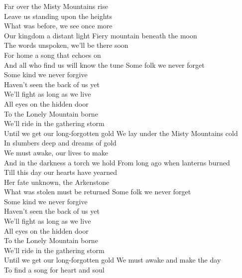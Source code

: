 \begin{flushleft}
Far over the Misty Mountains rise\\
Leave us standing upon the heights\\
What was before, we see once more\\
Our kingdom a distant light
\hop
Fiery mountain beneath the moon\\
The words unspoken, we'll be there soon\\
For home a song that echoes on\\
And all who find us will know the tune
\hops
\hspace{0.9cm}Some folk we never forget\\
\hspace{0.9cm}Some kind we never forgive\\
\hspace{0.9cm}Haven't seen the back of us yet\\
\hspace{0.9cm}We'll fight as long as we live\\
\hspace{0.9cm}All eyes on the hidden door\\
\hspace{0.9cm}To the Lonely Mountain borne\\
\hspace{0.9cm}We'll ride in the gathering storm\\
\hspace{0.9cm}Until we get our long-forgotten gold
\hops
We lay under the Misty Mountains cold\\
In slumbers deep and dreams of gold\\
We must awake, our lives to make\\
And in the darkness a torch we hold
\hop
From long ago when lanterns burned\\
Till this day our hearts have yearned\\
Her fate unknown, the Arkenstone\\
What was stolen must be returned
\hops
\hspace{0.9cm}Some folk we never forget\\
\hspace{0.9cm}Some kind we never forgive\\
\hspace{0.9cm}Haven't seen the back of us yet\\
\hspace{0.9cm}We'll fight as long as we live\\
\hspace{0.9cm}All eyes on the hidden door\\
\hspace{0.9cm}To the Lonely Mountain borne\\
\hspace{0.9cm}We'll ride in the gathering storm\\
\hspace{0.9cm}Until we get our long-forgotten gold
\hops
We must awake and make the day\\
To find a song for heart and soul
\end{flushleft}
\newpage